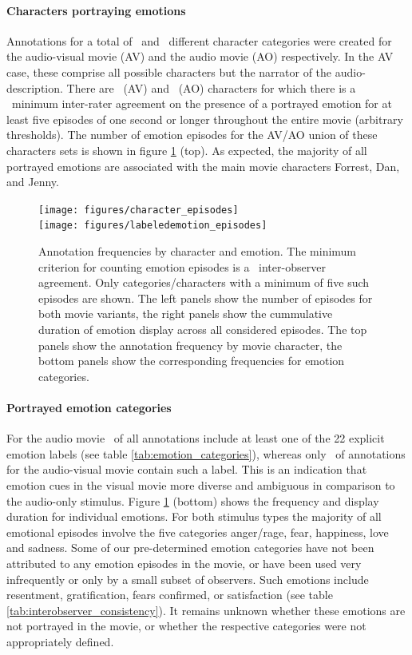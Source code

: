 \documentclass[10pt,a4paper,twocolumn]{article}
\begin{document}
\paragraph{Characters portraying emotions} Annotations for a total of
\AVTotalCharLabels\ and \AOTotalCharLabels\ different character categories were
created for the audio-visual movie (AV) and the audio movie (AO) respectively.
In the AV case, these comprise all possible characters but the narrator of the
audio-description.  There are \AVThreshCharLabels~(AV) and
\AOThreshCharLabels~(AO) characters for which there is a \AVAggThresh\ minimum
inter-rater agreement on the presence of a portrayed emotion for at least five
episodes of one second or longer throughout the entire movie (arbitrary
thresholds). The number of emotion episodes for the AV/AO union of these
characters sets is shown in figure \ref{fig:threshcharemo} (top).  As expected,
the majority of all portrayed emotions are associated with the main movie
characters Forrest, Dan, and Jenny.

\begin{figure}
  \centering
  \texttt{[image: figures/character\_episodes]}\\
  \texttt{[image: figures/labeledemotion\_episodes]}
  \caption{Annotation frequencies by character and emotion. The minimum
    criterion for counting emotion episodes is a \AVAggThresh\ inter-observer agreement.
    Only categories/characters with a minimum of five such episodes are shown.
    The left panels show the number of episodes for both movie variants, the
    right panels show the cummulative duration of emotion display across all
    considered episodes. The top panels show the annotation frequency by movie
    character, the bottom panels show the corresponding frequencies for emotion
  categories.}
  \label{fig:threshcharemo}
\end{figure}

\paragraph{Portrayed emotion categories} For the audio movie
\AOFracWithLabeledEmotions\ of all annotations include at least one of the 22
explicit emotion labels (see table \ref{tab:emotion_categories}), whereas only
\AVFracWithLabeledEmotions\ of annotations for the audio-visual movie contain
such a label. This is an indication that emotion cues in the visual movie more
diverse and ambiguous in comparison to the audio-only stimulus. Figure
\ref{fig:threshcharemo} (bottom) shows the frequency and display duration for
individual emotions. For both stimulus types the majority of all emotional
episodes involve the five categories anger/rage, fear, happiness, love and
sadness. Some of our pre-determined emotion categories have not been attributed
to any emotion episodes in the movie, or have been used very infrequently or
only by a small subset of observers.  Such emotions include resentment,
gratification, fears confirmed, or satisfaction (see table
\ref{tab:interobserver_consistency}).  It remains unknown whether these
emotions are not portrayed in the movie, or whether the respective categories
were not appropriately defined.
\end{document}
